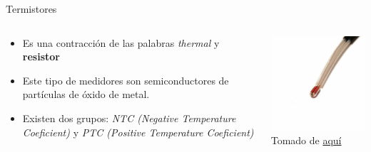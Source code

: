 \documentclass[aspectratio=169]{beamer}
\begin{document}
\begin{frame}{Termistores}
    \begin{columns}[c, onlytextwidth]
        \begin{column}{0.55\textwidth}
            \begin{itemize}
                \item Es una contracción de las palabras \textit{thermal} y \textbf{resistor} 
                \item Este tipo de medidores son semiconductores de partículas de óxido de metal. 
                \item Existen dos grupos: \textit{NTC (Negative Temperature Coeficient) } y \textit{PTC (Positive Temperature Coeficient)}
            \end{itemize}
        \end{column}
        \begin{column}{0.40\textwidth}
           \includegraphics[width=6.5cm]{fig/thermistor_NTC_100K.jpg}
            \\ \tiny{Tomado de \href{https://spool3d.ca/ntc-100k-thermistor-with-terminal/}{aquí}}
        \end{column}
    \end{columns}
\end{frame}
\end{document}
